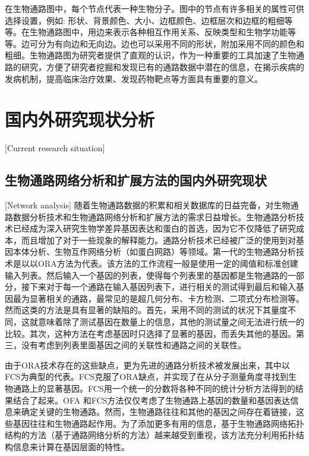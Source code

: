 在生物通路图中，每个节点代表一种生物分子。图中的节点有许多相关的属性可供选择设置，例如: 形状、背景颜色、大小、边框颜色、边框层次和边框的粗细等等。在生物通路图中，用边来表示各种相互作用关系、反映类型和生物学功能等等。边可分为有向边和无向边。边也可以采用不同的形状，附加采用不同的颜色和粗细。生物通路图为研究者提供了直观的认识，作为一种重要的工具加速了生物通路的研究，方便了研究者挖掘和发现已有的通路数据中潜在的信息，在揭示疾病的发病机制，提高临床治疗效果、发现药物靶点等方面具有重要的意义。

\section{国内外研究现状分析}[Current research situation]
\subsection{生物通路网络分析和扩展方法的国内外研究现状}[Network analysis]
 随着生物通路数据的积累和相关数据库的日益完备，对生物通路数据分析技术和生物通路网络分析和扩展方法的需求日益增长。生物通路分析技术已经成为深入研究生物学差异基因表达和蛋白的首选，因为它不仅降低了研究成本，而且增加了对于一些现象的解释能力。通路分析技术已经被广泛的使用到对基因本体分析、生物互作网络分析（如蛋白网路）等领域。第一代的生物通路分析技术是以以ORA\cite{goeman2007analyzing}方法为代表。该方法的工作流程一般是使用一定的阈值和标准创建输入列表。然后输入一个基因的列表，使得每个列表里的基因都是生物通路的一部分，接下来对于每一个通路在输入基因列表下，进行相关的测试得到最后和输入基因最为显著相关的通路，最常见的是超几何分布、卡方检测、二项式分布检测等。然而这类的方法是具有显著的缺陷的。首先，采用不同的测试的状况下其量度不同，这就意味着除了测试基因在数量上的信息，其他的测试量之间无法进行统一的比较。其次，这种方法在考虑基因时只选择了显著的基因，而丢失其他的基因。第三，没有考虑到列表里面基因之间的关联性和通路之间的关联性。

 由于ORA技术存在的这些缺点，更为先进的通路分析技术被发展出来，其中以FCS\cite{lee2011prioritizing}为典型的代表。FCS克服了ORA缺点，并实现了在从分子测量角度寻找到生物通路上的显著基因。FCS用一个统一的分数将各种不同的统计分析方法得到的结果结合了起来。OFA 和FCS方法仅仅考虑了生物通路上基因的数量和基因表达信息来确定关键的生物通路。然而，生物通路往往和其他的基因之间存在着链接，这些基因往往和生物通路起作用。为了添加更多有用的信息，基于生物通路网络拓扑结构的方法（基于通路网络分析的方法）越来越受到重视，该方法充分利用拓扑结构信息来计算在基因层面的特性。

